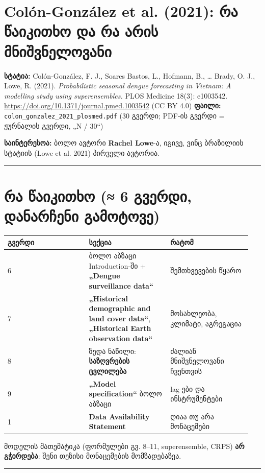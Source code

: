 \documentclass[11pt,a4paper]{article}
\begin{document}
\section*{Colón-González et al. (2021): რა წაიკითხო და რა არის მნიშვნელოვანი}

\textbf{სტატია:} Colón-González, F. J., Soares Bastos, L., Hofmann, B., … Brady, O. J., Lowe, R. (2021).
\emph{Probabilistic seasonal dengue forecasting in Vietnam: A modelling study using superensembles.}
PLOS Medicine 18(3): e1003542. \url{https://doi.org/10.1371/journal.pmed.1003542} (CC BY 4.0)
\textbf{ფაილი:} \texttt{colon\_gonzalez\_2021\_plosmed.pdf} (30 გვერდი; PDF-ის გვერდი = ჟურნალის გვერდი, „N / 30“)

\begin{tcolorbox}[colback=blue!4,colframe=blue!40!black,boxrule=0.4pt]\textbf{საინტერესოა:} ბოლო ავტორი \textbf{Rachel Lowe}-ა, იგივე, ვინც ბრაზილიის სტატიის (Lowe et al. 2021) პირველი ავტორია.\end{tcolorbox}

\medskip\hrule\medskip

\section*{რა წაიკითხო (≈ 6 გვერდი, დანარჩენი გამოტოვე)}

\begin{longtable}{@{}p{0.317\linewidth}p{0.317\linewidth}p{0.317\linewidth}@{}}
\toprule
\textbf{გვერდი} & \textbf{სექცია} & \textbf{რატომ} \\
\midrule
6 & ბოლო აბზაცი Introduction-ში + \textbf{„Dengue surveillance data“} & შემთხვევების წყარო \\
7 & \textbf{„Historical demographic and land cover data“}, \textbf{„Historical Earth observation data“} & მოსახლეობა, კლიმატი, აგრეგაცია \\
8 & ზედა ნაწილი: \textbf{საზღვრების ცვლილება} & ძალიან მნიშვნელოვანი ჩვენთვის \\
9 & \textbf{„Model specification“} ბოლო აბზაცი & lag-ები და ინსტრუმენტები \\
1 & \textbf{Data Availability Statement} & ღიაა თუ არა მონაცემები \\
\bottomrule
\end{longtable}

მოდელის მათემატიკა (ფორმულები გვ. 8–11, superensemble, CRPS) \textbf{არ გჭირდება}: შენი თეზისი მონაცემების მომზადებაზეა.

\medskip\hrule\medskip
\end{document}
